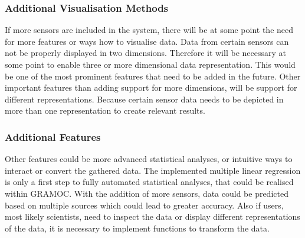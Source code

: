 \subsubsection{Additional Visualisation Methods}
If more sensors are included in the system, there will be at some point the need for more features or ways how to visualise data. Data from certain sensors can not be properly displayed in two dimensions. Therefore it will be necessary at some point to enable three or more dimensional data representation. This would be one of the most prominent features that need to be added in the future. Other important features than adding support for more dimensions, will be support for different representations. Because certain sensor data needs to be depicted in more than one representation to create relevant results.

\subsubsection{Additional Features}
Other features could be more advanced statistical analyses, or intuitive ways to interact or convert the gathered data. The implemented multiple linear regression is only a first step to fully automated statistical analyses, that could be realised within GRAMOC. With the addition of more sensors, data could be predicted based on multiple sources which could lead to greater accuracy. Also if users, most likely scientists, need to inspect the data or display different representations of the data, it is necessary to implement functions to transform the data.
